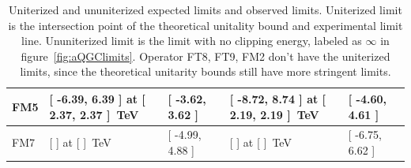 \begin{table}[ht!]
\begin{center}
{\begin{tabular}{ | l || l | l | l | l | }
FM5               &[ -6.39, 6.39 ] at [ 2.37, 2.37 ]~TeV & [ -3.62, 3.62 ] &[ -8.72, 8.74 ] at [ 2.19, 2.19 ]~TeV &[ -4.60, 4.61 ]\tabularnewline \hline
FM7               &[  ] at [  ]~TeV  & [ -4.99, 4.88 ]   &[  ] at [  ]~TeV &[ -6.75, 6.62 ]\tabularnewline \hline
\end{tabular}
}
\caption{Uniterized and ununiterized expected limits and observed limits. Uniterized limit is the intersection point of the theoretical unitality bound and experimental limit line. Ununiterized limit is the limit with no clipping energy, labeled as $\infty$ in figure~\ref{fig:aQGClimits}. Operator FT8, FT9, FM2 don't have the uniterized limits, since the theoretical unitarity bounds still have more stringent limits.}
\label{tab:aQGClimits}
\end{center}
\end{table}



